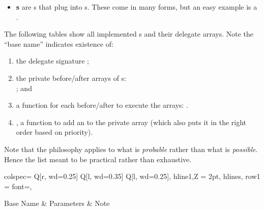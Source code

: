 \begin{itemize}
{\begin{center}
		\end{center}		 
		}
	\item{\textbf{s} are s that plug into s. These come in many forms, but an easy example is a . }
\end{itemize}


The following tables show all implemented s and their delegate arrays. Note the ``base name'' indicates existence of:

\begin{enumerate}
	\item{the delegate signature ;}
	\item{the private before/after arrays of s: \\; and}
	\item{a function for each before/after to execute the arrays: .}
	\item{, a function to add an  to the private array  (which also puts it in the right order based on priority).}
\end{enumerate}

\noindent Note that the philosophy applies to what is \textit{probable} rather than what is \textit{possible}. Hence the list meant to be practical rather than exhaustive.


\begin{longtblr}[
	caption = {Delegate Arrays for \code{AffinitiesComponent}},
	label = {delegate-arrays-affinitiescomponent},
]{
	colspec= {Q[r, wd=0.25\linewidth] Q[l, wd=0.35\linewidth] Q[l, wd=0.25\linewidth]},
	hline{1,Z} = {2pt},
	hlines,
	row{1} = {font=\bfseries},
}

	Base Name	& Parameters	& Note\\
	
\end{longtblr}


